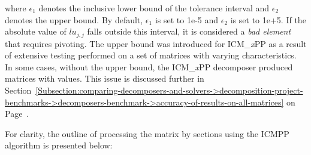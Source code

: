 where $\epsilon_1$ denotes the inclusive lower bound of the tolerance interval and $\epsilon_2$ denotes the upper bound.
By default, $\epsilon_1$ is set to 1e-5 and $\epsilon_2$ is set to 1e+5.
If the absolute value of $lu_{j, j}$ falls outside this interval, it is considered a \textit{bad element} that requires pivoting.
The upper bound was introduced for ICM\_\textit{x}PP as a result of extensive testing performed on a set of matrices with varying characteristics.
In some cases, without the upper bound, the ICM\_\textit{x}PP decomposer produced matrices with  values.
This issue is discussed further in Section~\ref{Subsection:comparing-decomposers-and-solvers->decomposition-project-benchmarks->decomposers-benchmark->accuracy-of-results-on-all-matrices} on Page~\pageref{Text:comparing-decomposers-and-solvers->decomposition-project-benchmarks->decomposers-benchmark->accuracy-of-results-on-all-matrices->double-precision->ICMxPP-nan-values-explanation-beginning}.

For clarity, the outline of processing the matrix by sections using the ICMPP algorithm is presented below:

